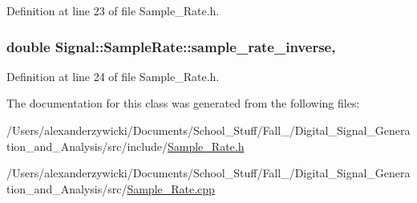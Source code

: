 Definition at line 23 of file Sample\+\_\+\+Rate.\+h.

\hypertarget{classSignal_1_1SampleRate_a970e812aa9bcfe7a7f04a98df0b659bc}{
\subsubsection[{sample\+\_\+rate\+\_\+inverse}]{\setlength{\rightskip}{0pt plus 5cm}double Signal\+::\+Sample\+Rate\+::sample\+\_\+rate\+\_\+inverse\hspace{0.3cm}{\ttfamily [static]}, {\ttfamily [protected]}}}\label{classSignal_1_1SampleRate_a970e812aa9bcfe7a7f04a98df0b659bc}


Definition at line 24 of file Sample\+\_\+\+Rate.\+h.



The documentation for this class was generated from the following files\+:\begin{DoxyCompactItemize}
\item 
/\+Users/alexanderzywicki/\+Documents/\+School\+\_\+\+Stuff/\+Fall\+\_/\+Digital\+\_\+\+Signal\+\_\+\+Generation\+\_\+and\+\_\+\+Analysis/src/include/\hyperlink{Sample__Rate_8h}{Sample\+\_\+\+Rate.\+h}\item 
/\+Users/alexanderzywicki/\+Documents/\+School\+\_\+\+Stuff/\+Fall\+\_/\+Digital\+\_\+\+Signal\+\_\+\+Generation\+\_\+and\+\_\+\+Analysis/src/\hyperlink{Sample__Rate_8cpp}{Sample\+\_\+\+Rate.\+cpp}\end{DoxyCompactItemize}
